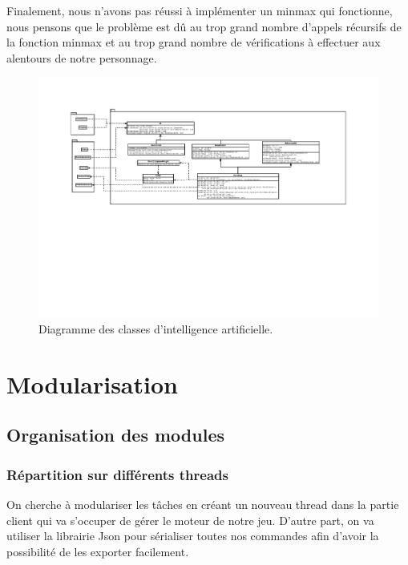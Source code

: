 \documentclass[a4paper,12pt]{article}
\begin{document}
Finalement, nous n'avons pas réussi à implémenter un minmax qui fonctionne, nous pensons que le problème est dû au trop grand nombre d'appels récursifs de la fonction minmax et au trop grand nombre de vérifications à effectuer aux alentours de notre personnage.

\begin{landscape}
\begin{figure}[p]
\includegraphics[width=0.9\paperheight]{ai.pdf}
\caption{\label{ai}Diagramme des classes d'intelligence artificielle.} 
\end{figure}
\end{landscape}


\section{Modularisation}
\label{sec:module}

\subsection{Organisation des modules}

\subsubsection{Répartition sur différents threads}

On cherche à modulariser les tâches en créant un nouveau thread dans la partie client qui va s'occuper de gérer le moteur de notre jeu.
D'autre part, on va utiliser la librairie Json pour sérialiser toutes nos commandes afin d'avoir la possibilité de les exporter facilement.
\end{document}

